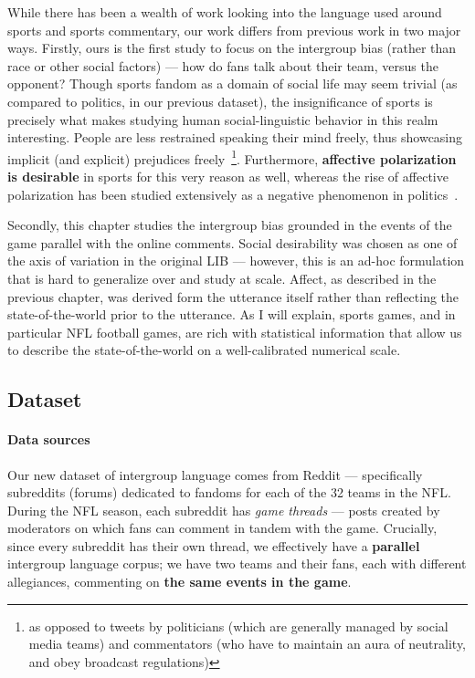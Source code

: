 While there has been a wealth of work looking into the language used around sports and sports commentary, our work differs from previous work in two major ways. Firstly, ours is the first study to focus on the intergroup bias (rather than race or other social factors) --- how do fans talk about their team, versus the opponent? Though sports fandom as a domain of social life may seem trivial (as compared to politics, in our previous dataset), the insignificance of sports is precisely what makes studying human social-linguistic behavior in this realm interesting. People are less restrained speaking their mind freely, thus showcasing implicit (and explicit) prejudices freely~\footnote{as opposed to tweets by politicians (which are generally managed by social media teams) and commentators (who have to maintain an aura of neutrality, and obey broadcast regulations)}. Furthermore, \textbf{affective polarization is desirable} in sports for this very reason as well, whereas the rise of affective polarization has been studied extensively as a negative phenomenon in politics~\citep{iyengar_origins_2019}.


Secondly, this chapter studies the intergroup bias grounded in the events of the game parallel with the online comments. Social desirability was chosen as one of the axis of variation in the original LIB --- however, this is an ad-hoc formulation that is hard to generalize over and study at scale. Affect, as described in the previous chapter, was derived form the utterance itself rather than reflecting the state-of-the-world prior to the utterance. As I will explain, sports games, and in particular NFL football games, are rich with statistical information that allow us to describe the state-of-the-world on a well-calibrated numerical scale.

\subsection{Dataset} 

\paragraph{Data sources} Our new dataset of intergroup language comes from Reddit --- specifically subreddits (forums) dedicated to fandoms for each of the 32 teams in the NFL. During the NFL season, each subreddit has \emph{game threads} --- posts created by moderators on which fans can comment in tandem with the game. Crucially, since every subreddit has their own thread, we effectively have a \textbf{parallel} intergroup language corpus; we have two teams and their fans, each with different allegiances, commenting on \textbf{the same events in the game}. 

